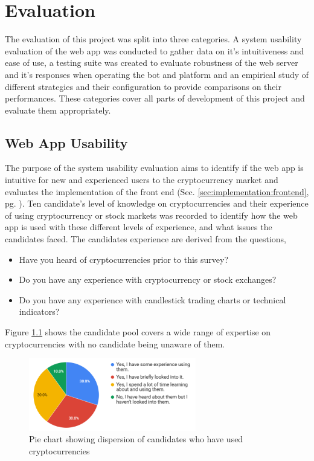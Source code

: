%
\chapter{Evaluation}
\label{sec:evaluation}

The evaluation of this project was split into three categories. A system usability evaluation of the web app was conducted to gather data on it's intuitiveness and ease of use, a testing suite was created to evaluate robustness of the web server and it's responses when operating the bot and platform and an empirical study of different strategies and their configuration to provide comparisons on their performances. These categories cover all parts of development of this project and evaluate them appropriately.


\section{Web App Usability}
\label{sec:evaluation:ui}
\noindent The purpose of the system usability evaluation aims to identify if the web app is intuitive for new and experienced users to the cryptocurrency market and evaluates the implementation of the front end (Sec. \ref{sec:implementation:frontend}, pg. \pageref{sec:implementation:frontend}). Ten candidate's level of knowledge on cryptocurrencies and their experience of using cryptocurrency or stock markets was recorded to identify how the web app is used with these different levels of experience, and what issues the candidates faced. The candidates experience are derived from the questions,
\begin{itemize}
	\item Have you heard of cryptocurrencies prior to this survey?
    \item Do you have any experience with cryptocurrency or stock exchanges?
    \item Do you have any experience with candlestick trading charts or technical indicators?
\end{itemize}


\noindent Figure \ref{fig:eval:web_app:heard_of_crypto} shows the candidate pool covers a wide range of expertise on cryptocurrencies with no candidate being unaware of them.

  \begin{figure}[ht]
  \centering
 \includegraphics[width=0.65\textwidth]{content/graphics/heard_of_crypto.PNG}
  \caption{Pie chart showing dispersion of candidates who have used cryptocurrencies}
  \label{fig:eval:web_app:heard_of_crypto}
\end{figure}

